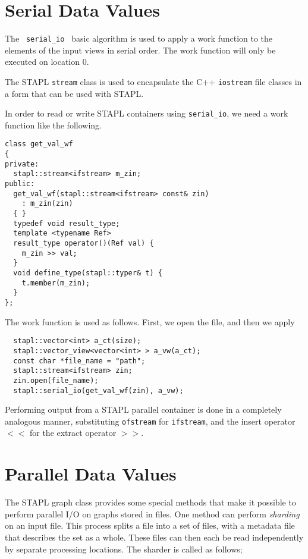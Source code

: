 
\section{Serial Data Values}

The 
\texttt{
serial\_io }
basic algorithm is used to apply a work function to the elements of
the input views in serial order.  The work function will only be executed
on location 0.

The STAPL \texttt{stream} class is used to encapsulate the C++ 
\texttt{iostream} file classes in a form that can be used with STAPL.

In order to read or write STAPL containers using \texttt{serial\_io},
we need a work function like the following.

\begin{verbatim}
class get_val_wf
{
private:
  stapl::stream<ifstream> m_zin;
public:
  get_val_wf(stapl::stream<ifstream> const& zin)
    : m_zin(zin)
  { }
  typedef void result_type;
  template <typename Ref>
  result_type operator()(Ref val) {
    m_zin >> val;
  }
  void define_type(stapl::typer& t) {
    t.member(m_zin);
  }
};
\end{verbatim}

The work function is used as follows.  First, we open the file, and then
we apply 

\begin{verbatim}
  stapl::vector<int> a_ct(size);
  stapl::vector_view<vector<int> > a_vw(a_ct);
  const char *file_name = "path";
  stapl::stream<ifstream> zin;
  zin.open(file_name);
  stapl::serial_io(get_val_wf(zin), a_vw);
\end{verbatim}

Performing output from a STAPL parallel container is done in a completely
analogous manner, substituting \texttt{ofstream} for \texttt{ifstream}, and
the insert operator $<<$ for the extract operator $>>$.


\section{Parallel Data Values}

The STAPL graph class provides some special methods that make it possible
to perform parallel I/O on graphs stored in files.  One method can perform
\textit{sharding} on an input file.  This process splits a file into a set
of files, with a metadata file that describes the set as a whole.  These
files can then each be read independently by separate processing locations.
The sharder is called as follows;


